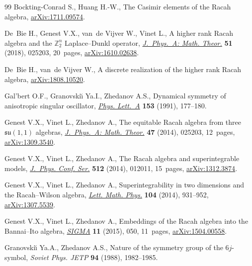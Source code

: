 \documentclass[11pt]{article}
\numberwithin{equation}{section}
\numberwithin{equation}{section}
\begin{document}
\begin{thebibliography}{99}
Bockting-Conrad S., Huang H.-W., The {C}asimir elements of the {R}acah algebra,
 \href{https://arxiv.org/abs/1711.09574}{arXiv:1711.09574}.

De~Bie H., Genest V.X., van~de Vijver W., Vinet L., A higher rank {R}acah
 algebra and the {${\mathbb Z}^n_2$} {L}aplace--{D}unkl operator,
 \href{https://doi.org/10.1088/1751-8121/aa9756}{\textit{J.~Phys.~A: Math. Theor.}} \textbf{51} (2018), 025203, 20~pages, \href{https://arxiv.org/abs/1610.02638}{arXiv:1610.02638}.

De~Bie H., van~de Vijver W., A discrete realization of the higher rank {R}acah
 algebra, \href{https://arxiv.org/abs/1808.10520}{arXiv:1808.10520}.

Gal'bert O.F., Granovski\u{\i} Ya.I., Zhedanov A.S., Dynamical symmetry of
 anisotropic singular oscillator, \href{https://doi.org/10.1016/0375-9601(91)90789-B}{\textit{Phys. Lett.~A}} \textbf{153} (1991), 177--180.

Genest V.X., Vinet L., Zhedanov A., The equitable {R}acah algebra from three
 {$\mathfrak{su}(1,1)$} algebras, \href{https://doi.org/10.1088/1751-8113/47/2/025203}{\textit{J.~Phys.~A: Math. Theor.}} \textbf{47} (2014), 025203, 12~pages, \href{https://arxiv.org/abs/1309.3540}{arXiv:1309.3540}.

Genest V.X., Vinet L., Zhedanov A., The {R}acah algebra and superintegrable
 models, \href{https://doi.org/10.1088/1742-6596/512/1/012011}{\textit{J.~Phys. Conf. Ser.}} \textbf{512} (2014), 012011, 15~pages, \href{https://arxiv.org/abs/1312.3874}{arXiv:1312.3874}.

Genest V.X., Vinet L., Zhedanov A., Superintegrability in two dimensions and
 the {R}acah--{W}ilson algebra, \href{https://doi.org/10.1007/s11005-014-0697-y}{\textit{Lett. Math. Phys.}} \textbf{104} (2014), 931--952, \href{https://arxiv.org/abs/1307.5539}{arXiv:1307.5539}.

Genest V.X., Vinet L., Zhedanov A., Embeddings of the {R}acah algebra into the
 {B}annai--{I}to algebra, \href{https://doi.org/10.3842/SIGMA.2015.050}{\textit{SIGMA}} \textbf{11} (2015), 050, 11~pages, \href{https://arxiv.org/abs/1504.00558}{arXiv:1504.00558}.

Granovski\u{\i} Ya.A., Zhedanov A.S., Nature of the symmetry group of the
 {$6j$}-symbol, \textit{Soviet Phys. JETP} \textbf{94} (1988), 1982--1985.


\end{thebibliography}
\end{document}
